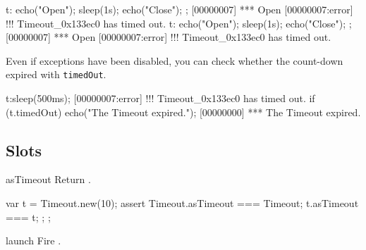 \begin{urbiscript}
t: { echo("Open"); sleep(1s); echo("Close"); };
[00000007] *** Open
[00000007:error] !!! Timeout_0x133ec0 has timed out.
t: { echo("Open"); sleep(1s); echo("Close"); };
[00000007] *** Open
[00000007:error] !!! Timeout_0x133ec0 has timed out.
\end{urbiscript}

Even if exceptions have been disabled, you can check whether the
count-down expired with \lstinline|timedOut|.

\begin{urbiscript}
t:sleep(500ms);
[00000007:error] !!! Timeout_0x133ec0 has timed out.
if (t.timedOut)
  echo("The Timeout expired.");
[00000000] *** The Timeout expired.
\end{urbiscript}

\subsection{Slots}
\begin{urbiscriptapi}
\item[asTimeout] Return \this.
\begin{urbiscript}
{
  var t = Timeout.new(10);
  assert
  {
    Timeout.asTimeout === Timeout;
          t.asTimeout === t;
  };
};
\end{urbiscript}

\item[launch]
  Fire \this.

\end{urbiscriptapi}


